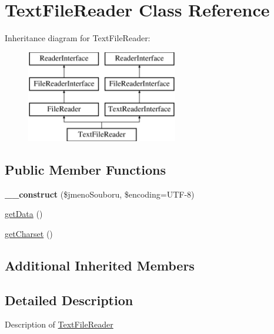 \hypertarget{class_pes_1_1_readers_1_1_text_file_reader}{}\section{Text\+File\+Reader Class Reference}
\label{class_pes_1_1_readers_1_1_text_file_reader}
Inheritance diagram for Text\+File\+Reader\+:\begin{figure}[H]
\begin{center}
\leavevmode
\includegraphics[height=4.000000cm]{class_pes_1_1_readers_1_1_text_file_reader}
\end{center}
\end{figure}
\subsection*{Public Member Functions}
\begin{DoxyCompactItemize}
\item 
\mbox{\label{class_pes_1_1_readers_1_1_text_file_reader_a0842dcf6203ebb360793ff13bfd8b1ce}} 
{\bfseries \+\_\+\+\_\+construct} (\$jmeno\+Souboru, \$encoding=\textquotesingle{}U\+TF-\/8\textquotesingle{})
\item 
\mbox{\hyperlink{class_pes_1_1_readers_1_1_text_file_reader_a81a67162a6288d78fc4c55283325f0b4}{get\+Data}} ()
\item 
\mbox{\hyperlink{class_pes_1_1_readers_1_1_text_file_reader_abca2d528da8311b6fcfe040768cbaa24}{get\+Charset}} ()
\end{DoxyCompactItemize}
\subsection*{Additional Inherited Members}


\subsection{Detailed Description}
Description of \mbox{\hyperlink{class_pes_1_1_readers_1_1_text_file_reader}{Text\+File\+Reader}}

